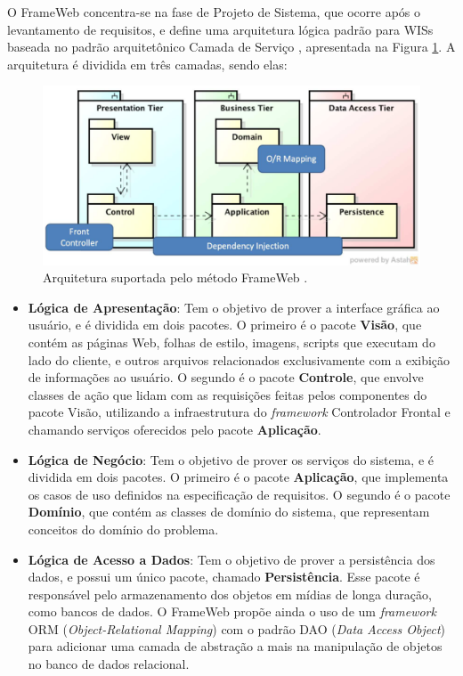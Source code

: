 O FrameWeb concentra-se na fase de Projeto de Sistema, que ocorre após o levantamento
de requisitos, e define uma arquitetura lógica padrão para WISs baseada no padrão 
arquitetônico Camada de Serviço \cite{fowler:2002}, apresentada na Figura \ref{fig-arquitetura-frameweb}.
A arquitetura é dividida em três camadas, sendo elas:

\begin{figure}
    \centering
    \includegraphics[width=.9\textwidth]{figuras/fig-arquitetura-frameweb.png} 
    \caption{Arquitetura suportada pelo método FrameWeb \cite{souza:2020}.}
    \label{fig-arquitetura-frameweb}
\end{figure}


\begin{itemize}
    \item \textbf{Lógica de Apresentação}: Tem o objetivo de prover a interface gráfica
        ao usuário, e é dividida em dois pacotes. O primeiro é o pacote \textbf{Visão},
        que contém as páginas Web, folhas de estilo, imagens, scripts que executam do lado do cliente,
        e outros arquivos relacionados exclusivamente com a exibição de informações ao usuário.
        O segundo é o pacote \textbf{Controle}, que envolve classes de ação que lidam com as requisições
        feitas pelos componentes do pacote Visão, utilizando a infraestrutura do \textit{framework} 
        Controlador Frontal e chamando serviços oferecidos pelo pacote \textbf{Aplicação}.

    \item \textbf{Lógica de Negócio}: Tem o objetivo de prover os serviços do sistema, e é dividida
        em dois pacotes. O primeiro é o pacote \textbf{Aplicação}, que implementa os casos de uso 
        definidos na especificação de requisitos. O segundo é o pacote \textbf{Domínio}, que contém 
        as classes de domínio do sistema, que representam conceitos do domínio do problema. 

    \item \textbf{Lógica de Acesso a Dados}: Tem o objetivo de prover a persistência dos dados, e 
        possui um único pacote, chamado \textbf{Persistência}. Esse pacote é responsável pelo armazenamento
        dos objetos em mídias de longa duração, como bancos de dados. O FrameWeb propõe ainda o uso de um
        \textit{framework} ORM (\textit{Object-Relational Mapping}) com o padrão DAO (\textit{Data Access Object}) \cite{alur:2003}
        para adicionar uma camada de abstração a mais na manipulação de objetos no banco de dados relacional.
\end{itemize}

